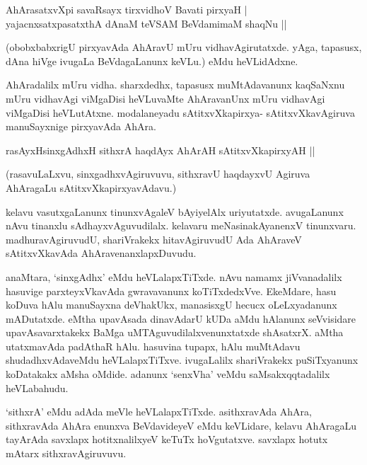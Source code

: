 \begin{shloka}
AhArasatxvXpi savaRsayx tirxvidhoV Bavati pirxyaH |\\
yajacnxsatxpasatxthA dAnaM teVSAM BeVdamimaM shaqNu ||
\end{shloka}

(obobxbabxrigU pirxyavAda AhAravU mUru vidhavAgirutatxde. yAga, tapasusx, dAna hiVge ivugaLa BeVdagaLanunx keVLu.) eMdu heVLidAdxne.


AhAradalilx mUru vidha. sharxdedhx, tapasusx muMtAdavanunx kaqSaNxnu mUru vidhavAgi viMgaDisi heVLuvaMte AhAravanUnx mUru vidhavAgi viMgaDisi heVLutAtxne. modalaneyadu sAtitxvXkapirxya- sAtitxvXkavAgiruva manuSayxnige pirxyavAda AhAra.

\begin{shloka}
rasAyxHsinxgAdhxH sithxrA haqdAyx AhArAH sAtitxvXkapirxyAH ||
\end{shloka}

(rasavuLaLxvu, sinxgadhxvAgiruvuvu, sithxravU haqdayxvU Agiruva AhAragaLu sAtitxvXkapirxyavAdavu.)

kelavu vasutxgaLanunx tinunxvAgaleV bAyiyelAlx uriyutatxde. avugaLanunx nAvu tinanxlu sAdhayxvAguvudilalx. kelavaru meNasinakAyanenxV tinunxvaru. madhuravAgiruvudU, shariVrakekx hitavAgiruvudU Ada AhAraveV sAtitxvXkavAda AhAravenanxlapxDuvudu.

anaMtara, `sinxgAdhx' eMdu heVLalapxTiTxde. nAvu namamx jiVvanadalilx hasuvige parxteyxVkavAda gwravavanunx koTiTxdedxVve. EkeMdare, hasu koDuva hAlu manuSayxna deVhakUkx, manasisxgU hecucx oLeLxyadanunx mADutatxde. eMtha upavAsada dinavAdarU kUDa aMdu hAlanunx seVvisidare upavAsavarxtakekx BaMga uMTAguvudilalxvenunxtatxde shAsatxrX. aMtha utatxmavAda padAthaR hAlu. hasuvina tupapx, hAlu muMtAdavu shudadhxvAdaveMdu heVLalapxTiTxve. ivugaLalilx shariVrakekx puSiTxyanunx koDatakakx aMsha oMdide. adanunx `senxVha' veMdu saMsakxqqtadalilx heVLabahudu.

`sithxrA' eMdu adAda meVle heVLalapxTiTxde. asithxravAda AhAra, sithxravAda AhAra enunxva BeVdavideyeV eMdu keVLidare, kelavu AhAragaLu tayArAda savxlapx hotitxnalilxyeV keTuTx hoVgutatxve. savxlapx hotutx mAtarx sithxravAgiruvuvu.

